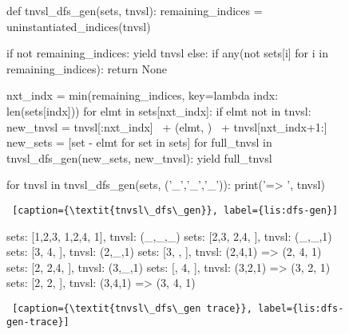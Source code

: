 \begin{figure}[htb]
    \centering
\begin{minipage}[c]{0.45\textwidth}
\begin{python1}  
def tnvsl_dfs_gen(sets, tnvsl):
  remaining_indices = uninstantiated_indices(tnvsl)

  if not remaining_indices: yield tnvsl
  else:
    if any(not sets[i] for i in remaining_indices):
      return None
      
    nxt_indx = min(remaining_indices,
                   key=lambda indx: len(sets[indx]))
    for elmt in sets[nxt_indx]:
      if elmt not in tnvsl:
        new_tnvsl = tnvsl[:nxt_indx] \
                    + (elmt, ) \
                    + tnvsl[nxt_indx+1:]
        new_sets = [set - {elmt} for set in sets]
        for full_tnvsl in tnvsl_dfs_gen(new_sets, 
                                        new_tnvsl):
          yield full_tnvsl


for tnvsl in tnvsl_dfs_gen(sets, ('_','_','_')):
    print('=> ', tnvsl)
\end{python1}\linv
\begin{lstlisting} [caption={\textit{tnvsl\_dfs\_gen}}, label={lis:dfs-gen}]
\end{lstlisting}


\begin{python1}  
sets: [{1,2,3}, {1,2,4}, {1}], tnvsl: (_,_,_)
  sets: [{2,3}, {2,4}, {}], tnvsl: (_,_,1)
    sets: [{3}, {4}, {}], tnvsl: (2,_,1)
      sets: [{3}, {}, {}], tnvsl: (2,4,1)
=>  (2, 4, 1)
    sets: [{2}, {2,4}, {}], tnvsl: (3,_,1)
      sets: [{}, {4}, {}], tnvsl: (3,2,1)
=>  (3, 2, 1)
      sets: [{2}, {2}, {}], tnvsl: (3,4,1)
=>  (3, 4, 1)
\end{python1}\linv
\begin{lstlisting} [caption={\textit{tnvsl\_dfs\_gen trace}}, label={lis:dfs-gen-trace}]
\end{lstlisting}
\end{minipage}\linv
\end{figure}

